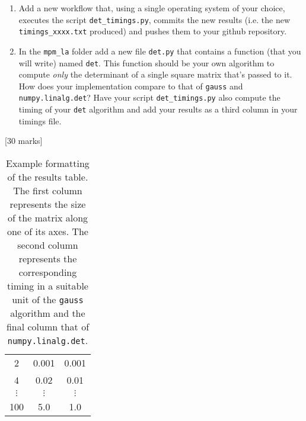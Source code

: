 \documentclass[a4paper,11pt]{article}
\begin{document}
\begin{enumerate}
\begin{enumerate}
 for many ($\approx10$) square matrices of increasing size, record
 the time taken by the \texttt{gauss} algorithm
 to compute the determinant of these matrices. Additionally, for each of these matrices compute the time taken by
 \texttt{numpy.linalg.det} to calculate the determinant. Timing results should be
 written automatically by the script to a file named \texttt{timings.txt} (or \texttt{timings\_\textit{something}.txt})in the \texttt{results/} folder with the
 formatting illustrated in Table \ref{timings_table}.
 \item Add a new workflow that, using a single operating system of your choice, executes the
 script \texttt{det\_timings.py}, commits the new results (i.e. the new \texttt{timings\_xxxx.txt} produced)
 and pushes them to your github repository.
 \item In the \texttt{mpm\_la} folder add a new file \texttt{det.py} that contains a function (that you will write) named
 \texttt{det}. This function should be your own algorithm to compute \textit{only} the determinant
 of a single square matrix that's passed to it. How does your implementation compare to that of \texttt{gauss}
 and \texttt{numpy.linalg.det}? Have your script \texttt{det\_timings.py} also compute the timing of your
 \texttt{det} algorithm and add your results as a third column in your timings file.
\end{enumerate}
[30 marks]
\end{enumerate}

\begin{table}
\begin{center}
\begin{tabular}{ c c c }
 2 & 0.001 & 0.001 \\ 
 4 & 0.02 & 0.01 \\  
 $\vdots$ & $\vdots$ & $\vdots$ \\
 100 & 5.0 & 1.0
\end{tabular}
\end{center}
\caption{\label{timings_table}Example formatting of the results table. The first column represents
the size of the matrix along one of its axes. The second column represents the corresponding timing
in a suitable unit of the \texttt{gauss} algorithm and the final column that of \texttt{numpy.linalg.det}.}
\end{table}
\end{document}
